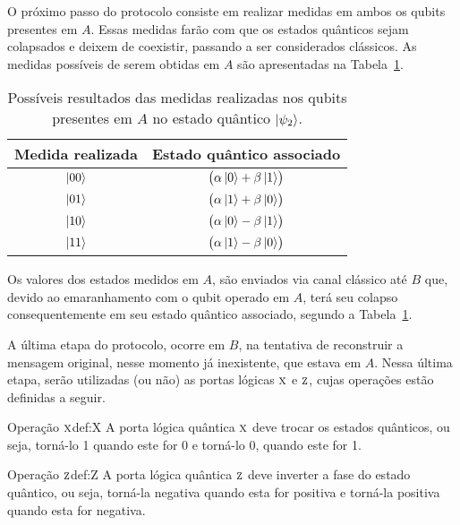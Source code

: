 O próximo passo do protocolo consiste em realizar medidas em ambos os qubits presentes em \(A\). Essas medidas farão com que os estados quânticos sejam colapsados e deixem de coexistir, passando a ser considerados clássicos. As medidas possíveis de serem obtidas em \(A\) são apresentadas na Tabela~\ref{tab:medidas}.

\begin{table}[ht!]
  \centering
  \caption{Possíveis resultados das medidas realizadas nos qubits presentes em \(A\) no estado quântico $\ket{\psi_2}$.}\label{tab:medidas}
  \begin{tabular}{cc}
    \toprule
    {\textbf{Medida realizada}} & {\textbf{Estado quântico associado}}\\
    \midrule
    $\ket{00}$   & $\bigl( \alpha \ket{0} + \beta \ket{1} \bigr)$\\
    $\ket{01}$   & $\bigl( \alpha \ket{1} + \beta \ket{0} \bigr)$\\
    $\ket{10}$   & $\bigl( \alpha \ket{0} - \beta \ket{1} \bigr)$\\
    $\ket{11}$   & $\bigl( \alpha \ket{1} - \beta \ket{0} \bigr)$\\
    \bottomrule
  \end{tabular}
\end{table}

Os valores dos estados medidos em \(A\), são enviados via canal clássico até \(B\) que, devido ao emaranhamento com o qubit operado em \(A\), terá seu colapso consequentemente em seu estado quântico associado, segundo a Tabela~\ref{tab:medidas}.

A última etapa do protocolo, ocorre em \(B\), na tentativa de reconstruir a mensagem original, nesse momento já inexistente, que estava em \(A\). Nessa última etapa, serão utilizadas (ou não) as portas lógicas \(\operatorname{\textsc{x}}\) e \(\operatorname{\textsc{z}}\), cujas operações estão definidas a seguir.

\begin{theo}{Operação \(\operatorname{\textsc{x}}\)}{def:X}
A porta lógica quântica \(\operatorname{\textsc{x}}\) deve trocar os estados quânticos, ou seja, torná-lo 1 quando este for 0 e torná-lo 0, quando este for 1.
\end{theo}

\begin{theo}{Operação \(\operatorname{\textsc{z}}\)}{def:Z}
A porta lógica quântica \(\operatorname{\textsc{z}}\) deve inverter a fase do estado quântico, ou seja, torná-la negativa quando esta for positiva e torná-la positiva quando esta for negativa.
\end{theo}

